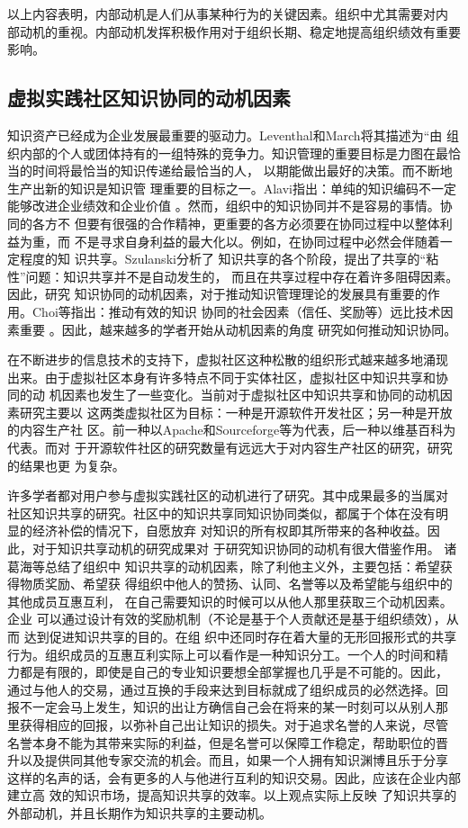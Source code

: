 以上内容表明，内部动机是人们从事某种行为的关键因素。组织中尤其需要对内
部动机的重视。内部动机发挥积极作用对于组织长期、稳定地提高组织绩效有重要
影响。


\subsection{虚拟实践社区知识协同的动机因素}


知识资产已经成为企业发展最重要的驱动力。Leventhal和March将其描述为“由
组织内部的个人或团体持有的一组特殊的竞争力\cite{levinthal1993ml}。知识管理的重要目标是力图在最恰当的时间将最恰当的知识传递给最恰当的人，
以期能做出最好的决策\cite{Petrash1996}。而不断地生产出新的知识是知识管
理重要的目标之一。Alavi指出：单纯的知识编码不一定能够改进企业绩效和企业价值
\cite{alavi2000mok}。然而，组织中的知识协同并不是容易的事情。协同的各方不
但要有很强的合作精神，更重要的各方必须要在协同过程中以整体利益为重，而
不是寻求自身利益的最大化以。例如，在协同过程中必然会伴随着一定程度的知
识共享。Szulanski分析了
知识共享的各个阶段，提出了共享的“粘性”问题：知识共享并不是自动发生的，
而且在共享过程中存在着许多阻碍因素\cite{szulanski2000pkt}。因此，研究
知识协同的动机因素，对于推动知识管理理论的发展具有重要的作用。Choi等指出：推动有效的知识
协同的社会因素（信任、奖励等）远比技术因素重要
\cite{SueYoungChoi10012008}。因此，越来越多的学者开始从动机因素的角度
研究如何推动知识协同。

在不断进步的信息技术的支持下，虚拟社区这种松散的组织形式越来越多地涌现
出来。由于虚拟社区本身有许多特点不同于实体社区，虚拟社区中知识共享和协
同的动
机因素也发生了一些变化。当前对于虚拟社区中知识共享和协同的动机因素研究主要以
这两类虚拟社区为目标：一种是开源软件开发社区；另一种是开放的内容生产社
区。前一种以Apache和Sourceforge等为代表，后一种以维基百科为代表。而对
于开源软件社区的研究数量有远远大于对内容生产社区的研究，研究的结果也更
为复杂。

许多学者都对用户参与虚拟实践社区的动机进行了研究。其中成果最多的当属对
社区知识共享的研究。社区中的知识共享同知识协同类似，都属于个体在没有明
显的经济补偿的情况下，自愿放弃
对知识的所有权即其所带来的各种收益。因此，对于知识共享动机的研究成果对
于研究知识协同的动机有很大借鉴作用。
诸葛海等总结了组织中
知识共享的动机因素，除了利他主义外，主要包括：希望获得物质奖励、希望获
得组织中他人的赞扬、认同、名誉等以及希望能与组织中的其他成员互惠互利，
在自己需要知识的时候可以从他人那里获取三个动机因素\cite{Zhugea}。企业
可以通过设计有效的奖励机制（不论是基于个人贡献还是基于组织绩效），从而
达到促进知识共享的目的\cite{Lee2007}。在组
织中还同时存在着大量的无形回报形式的共享
行为。组织成员的互惠互利实际上可以看作是一种知识分工。一个人的时间和精
力都是有限的，即使是自己的专业知识要想全部掌握也几乎是不可能的。因此，
通过与他人的交易，通过互换的手段来达到目标就成了组织成员的必然选择。回
报不一定会马上发生，知识的出让方确信自己会在将来的某一时刻可以从别人那
里获得相应的回报，以弥补自己出让知识的损失。对于追求名誉的人来说，尽管
名誉本身不能为其带来实际的利益，但是名誉可以保障工作稳定，帮助职位的晋
升以及提供同其他专家交流的机会。而且，如果一个人拥有知识渊博且乐于分享
这样的名声的话，会有更多的人与他进行互利的知识交易。因此，应该在企业内部建立高
效的知识市场，提高知识共享的效率\cite{Andreas2007}。以上观点实际上反映
了知识共享的外部动机，并且长期作为知识共享的主要动机。




